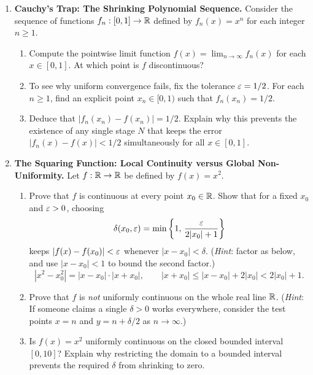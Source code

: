 \begin{enumerate}
  \item \textbf{Cauchy's Trap: The Shrinking Polynomial Sequence.}
  Consider the sequence of functions $f_n: [0, 1] \to \mathbb{R}$ defined by $f_n(x) = x^n$ for each integer $n \ge 1$.
  \begin{enumerate}
    \item Compute the pointwise limit function $f(x) = \lim_{n \to \infty} f_n(x)$ for each $x \in [0, 1]$. At which point is $f$ discontinuous?
    \item To see why uniform convergence fails, fix the tolerance $\varepsilon = 1/2$. For each $n \ge 1$, find an explicit point $x_n \in [0, 1)$ such that $f_n(x_n) = 1/2$.
    \item Deduce that $|f_n(x_n) - f(x_n)| = 1/2$. Explain why this prevents the existence of any single stage $N$ that keeps the error $|f_n(x) - f(x)| < 1/2$ simultaneously for all $x \in [0, 1]$.
  \end{enumerate}

  \item \textbf{The Squaring Function: Local Continuity versus Global Non-Uniformity.}
  Let $f: \mathbb{R} \to \mathbb{R}$ be defined by $f(x) = x^2$.
  \begin{enumerate}
    \item Prove that $f$ is continuous at every point $x_0 \in \mathbb{R}$. Show that for a fixed $x_0$ and $\varepsilon > 0$, choosing
    \[
    \delta(x_0, \varepsilon) = \min\left\{1, \, \frac{\varepsilon}{2|x_0| + 1}\right\}
    \]
    keeps $|f(x) - f(x_0)| < \varepsilon$ whenever $|x - x_0| < \delta$. (\emph{Hint}: factor as below, and use $|x - x_0| < 1$ to bound the second factor.)
    \[
    |x^2 - x_0^2| = |x - x_0| \cdot |x + x_0|, \qquad |x + x_0| \le |x - x_0| + 2|x_0| < 2|x_0| + 1.
    \]
    \item Prove that $f$ is \emph{not} uniformly continuous on the whole real line $\mathbb{R}$. (\emph{Hint}: If someone claims a single $\delta > 0$ works everywhere, consider the test points $x = n$ and $y = n + \delta/2$ as $n \to \infty$.)
    \item Is $f(x) = x^2$ uniformly continuous on the closed bounded interval $[0, 10]$? Explain why restricting the domain to a bounded interval prevents the required $\delta$ from shrinking to zero.
  \end{enumerate}


\end{enumerate}
